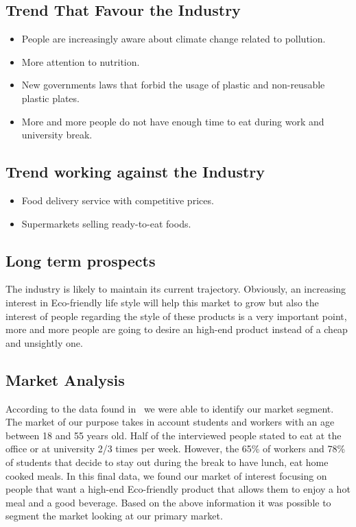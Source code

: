 \subsection{Trend That Favour the Industry}
\begin{itemize}
\item People are increasingly aware about climate change related to pollution.
\item More attention to nutrition.
\item New governments laws that forbid the usage of plastic and non-reusable plastic plates.
\item More and more people do not have enough time to eat during work and university break.
\end{itemize}

\subsection{Trend working against the Industry}
\begin{itemize}
\item Food delivery service with competitive prices.
\item Supermarkets selling ready-to-eat foods.
\end{itemize}

\subsection{Long term prospects}
The industry is likely to maintain its current trajectory. Obviously, an increasing interest in Eco-friendly life style will help this market to grow but also the interest of people regarding the style of these products is a very important point, more and more people are going to desire an high-end product instead of a cheap and unsightly one.

\subsection{Market Analysis}
According to the data found in~\cite{dati_pranzo} we were able to identify our market segment. The market of our purpose takes in account students and workers with an age between 18 and 55 years old. Half of the interviewed people stated to eat at the office or at university 2/3 times per week. However, the 65\% of workers and 78\% of students that decide to stay out during the break to have lunch, eat home cooked meals. In this final data, we found our market of interest focusing on people that want a high-end Eco-friendly product that allows them to enjoy a hot meal and a good beverage.
Based on the above information it was possible to segment the market looking at our primary market.

